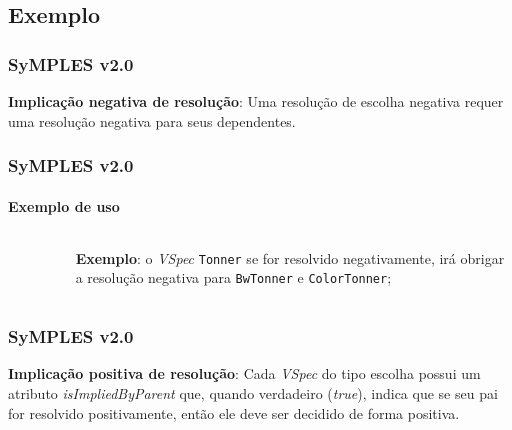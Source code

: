 \subsection{Exemplo}

\begin{frame}
\frametitle{SyMPLES v2.0}

  \textbf{Implicação negativa de resolução}: Uma resolução de escolha negativa requer uma resolução negativa para seus dependentes.

\end{frame}


\begin{frame}
\frametitle{SyMPLES v2.0}
\framesubtitle{Exemplo de uso}
  
  \begin{columns}[onlytextwidth]
  
    \begin{column}{0.5\textwidth}
      \begin{figure}
      \end{figure}
    \end{column}
    
    \begin{column}{0.5\textwidth}
      \textbf{Exemplo}: o \textit{VSpec} \texttt{Tonner} se for resolvido negativamente, irá obrigar a resolução negativa para \texttt{BwTonner} e \texttt{ColorTonner};
    \end{column}
    
  \end{columns}

\end{frame}


\begin{frame}
\frametitle{SyMPLES v2.0}

  \textbf{Implicação positiva de resolução}: Cada \textit{VSpec} do tipo escolha possui um atributo \textit{isImpliedByParent} que, quando verdadeiro (\textit{true}), indica que se seu pai for resolvido positivamente, então ele deve ser decidido de forma positiva.

\end{frame}


